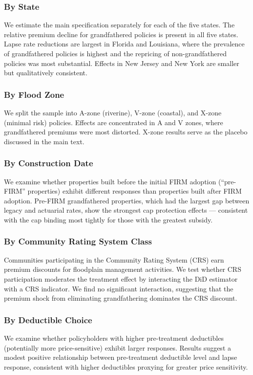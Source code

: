 \documentclass[12pt]{article}
\begin{document}
\subsubsection*{By State} We estimate the main specification separately for each of the five states. The relative premium decline for grandfathered policies is present in all five states. Lapse rate reductions are largest in Florida and Louisiana, where the prevalence of grandfathered policies is highest and the repricing of non-grandfathered policies was most substantial. Effects in New Jersey and New York are smaller but qualitatively consistent.

\subsubsection*{By Flood Zone} We split the sample into A-zone (riverine), V-zone (coastal), and X-zone (minimal risk) policies. Effects are concentrated in A and V zones, where grandfathered premiums were most distorted. X-zone results serve as the placebo discussed in the main text.

\subsubsection*{By Construction Date} We examine whether properties built before the initial FIRM adoption (``pre-FIRM'' properties) exhibit different responses than properties built after FIRM adoption. Pre-FIRM grandfathered properties, which had the largest gap between legacy and actuarial rates, show the strongest cap protection effects --- consistent with the cap binding most tightly for those with the greatest subsidy.

\subsubsection*{By Community Rating System Class} Communities participating in the Community Rating System (CRS) earn premium discounts for floodplain management activities. We test whether CRS participation moderates the treatment effect by interacting the DiD estimator with a CRS indicator. We find no significant interaction, suggesting that the premium shock from eliminating grandfathering dominates the CRS discount.

\subsubsection*{By Deductible Choice} We examine whether policyholders with higher pre-treatment deductibles (potentially more price-sensitive) exhibit larger responses. Results suggest a modest positive relationship between pre-treatment deductible level and lapse response, consistent with higher deductibles proxying for greater price sensitivity.
\end{document}
